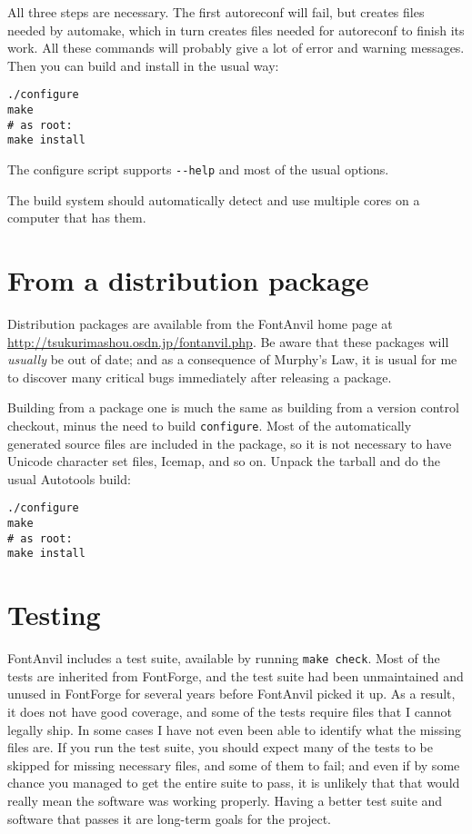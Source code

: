 All three steps are necessary.  The first autoreconf will fail, but creates
files needed by automake, which in turn creates files needed for autoreconf
to finish its work.  All these commands will probably give a lot of error
and warning messages.  Then you can build and install in the usual way:

\begin{verbatim}
./configure
make
# as root:
make install
\end{verbatim}

The configure script supports \texttt{-{}-help} and most of the usual
options.

The build system should automatically detect and use multiple cores on a
computer that has them.

\section{From a distribution package}

Distribution packages are available from the FontAnvil home page at
\url{http://tsukurimashou.osdn.jp/fontanvil.php}.  Be aware that these
packages will \emph{usually} be out of date; and as a consequence of
Murphy's Law, it is usual for me to discover many critical bugs immediately
after releasing a package.

Building from a package one is much the same as building from a version
control checkout, minus the need to build \texttt{configure}.  Most of the
automatically generated source files are included in the package, so it is
not necessary to have Unicode character set files, Icemap, and so on.
Unpack the tarball and do the usual Autotools build:

\begin{verbatim}
./configure
make
# as root:
make install
\end{verbatim}

\section{Testing}

FontAnvil includes a test suite, available by running \texttt{make check}. 
Most of the tests are inherited from FontForge, and the test suite had been
unmaintained and unused in FontForge for several years before FontAnvil
picked it up.  As a result, it does not have good coverage, and some of the
tests require files that I cannot legally ship.  In some cases I have not
even been able to identify what the missing files are.  If you run the test
suite, you should expect many of the tests to be skipped for missing
necessary files, and some of them to fail; and even if by some chance you
managed to get the entire suite to pass, it is unlikely that that would
really mean the software was working properly.  Having a better test suite
and software that passes it are long-term goals for the project.

